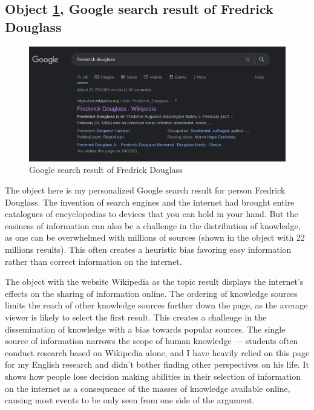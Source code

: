 \documentclass[a4paper,11pt]{article}
\begin{document}


\subsection*{Object \ref{fig:download}, Google search result of Fredrick Douglass}

\begin{figure}[h!]
 \centering
 \includegraphics[scale=0.25]{douglass.png}
 \caption{Google search result of Fredrick Douglass}
 \label{fig:download}
\end{figure}

The object here is my personalized Google search result for person Fredrick Douglass. The invention of search engines and the internet had brought entire catalogues of encyclopedias to devices that you can hold in your hand. But the easiness of information can also be a challenge in the distribution of knowledge, as one can be overwhelmed with millions of sources (shown in the object with 22 millions results). This often creates a heuristic bias favoring easy information rather than correct information on the internet.

The object with the website Wikipedia as the topic result displays the internet's effects on the sharing of information online. The ordering of knowledge sources limits the reach of other knowledge sources further down the page, as the average viewer is likely to select the first result. This creates a challenge in the dissemination of knowledge with a bias towards popular sources. The single source of information narrows the scope of human knowledge --- students often conduct research based on Wikipedia alone, and I have heavily relied on this page for my English research and didn't bother finding other perspectives on his life. It shows how people lose decision making abilities in their selection of information on the internet as a consequence of the masses of knowledge available online, causing most events to be only seen from one side of the argument.
\end{document}
